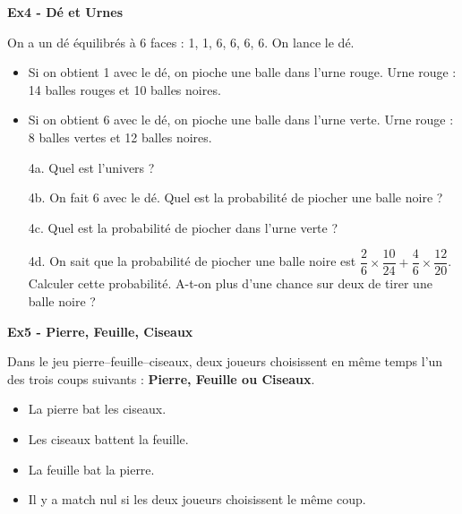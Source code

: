 \textbf{Ex4 - Dé et Urnes}

On a un dé équilibrés à 6 faces : 1, 1, 6, 6, 6, 6. On lance le dé. 

\begin{multicols}{2}\noindent
\begin{itemize}[label={$\bullet$}]
  \item Si on obtient 1 avec le dé, on pioche une balle dans l'urne rouge.
  Urne rouge : 14 balles rouges et 10 balles noires.

  \item Si on obtient 6 avec le dé, on pioche une balle dans l'urne verte.
  Urne rouge : 8 balles vertes et 12 balles noires.
\end{itemize}
\end{multicols}

\begin{enumerate}
  \item[4a.] Quel est l'univers ? \\ \Pointilles[2] 
  \item[4b.] On fait 6 avec le dé. Quel est la probabilité de piocher une balle noire ? \\ \Pointilles[2] 
  \item[4c.] Quel est la probabilité de piocher dans l'urne verte ? \\ \Pointilles[2] 
  \item[4d.] On sait que la probabilité de piocher une balle noire est $\dfrac{2}{6} \times \dfrac{10}{24} + \dfrac{4}{6} \times \dfrac{12}{20}$. \\
  Calculer cette probabilité. A-t-on plus d'une chance sur deux de tirer une balle noire ? \\ \Pointilles[3] 
\end{enumerate}

\textbf{Ex5 - Pierre, Feuille, Ciseaux}

Dans le jeu pierre–feuille–ciseaux, deux joueurs choisissent en même temps l’un des trois coups suivants : \textbf{Pierre, Feuille ou Ciseaux}.

\begin{itemize}[label={$\bullet$}]
  \item La pierre bat les ciseaux.
  \item Les ciseaux battent la feuille. 
  \item La feuille bat la pierre.
  \item Il y a match nul si les deux joueurs choisissent le même coup.
\end{itemize}

